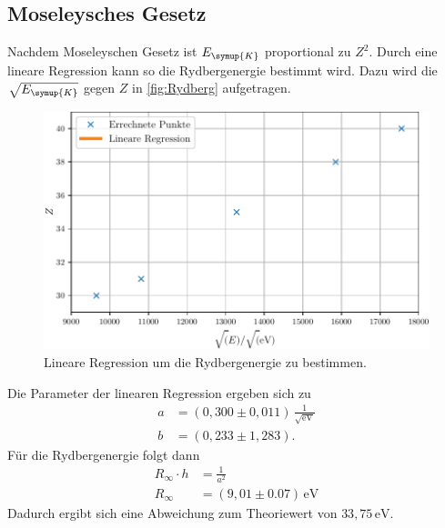 \subsection{Moseleysches Gesetz}
\label{sec:MoseleyschesGesetz}
Nachdem Moseleyschen Gesetz ist $E_{\symup{K}}$ proportional zu $Z^2$. Durch eine lineare Regression kann so
die Rydbergenergie bestimmt wird. Dazu wird die $\sqrt{E_{\symup{K}}}$ gegen $Z$ in \autoref{fig:Rydberg} 
aufgetragen.
\begin{figure}
  \centering
  \includegraphics{build/rydberg.pdf}
  \caption{Lineare Regression um die Rydbergenergie zu bestimmen.}
  \label{fig:Rydberg}
\end{figure}
Die Parameter der linearen Regression ergeben sich zu
\begin{align*}
  a &= (0,300 \pm 0,011)\,\frac{1}{\sqrt{\unit{\eV}}} \\
  b &= (0,233 \pm 1,283).
\end{align*}
Für die Rydbergenergie folgt dann
\begin{align*}
  R_{\infty}\cdot h &= \frac{1}{a^2} \\
  R_{\infty} &= (9,01 \pm 0.07)\,\unit{\eV}
\end{align*}
Dadurch ergibt sich eine Abweichung zum Theoriewert von $33,75\,\unit{\eV}$.